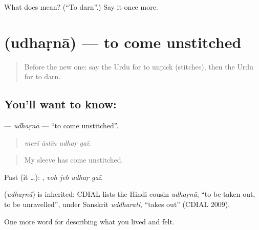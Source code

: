 \begin{tcolorbox}[breakable,colback=teal!4,colframe=teal!35!black,title={Before you move on}]
What does   mean? (\textquotedblleft{}To darn\textquotedblright{}.) Say it once more.
\end{tcolorbox}
\section[\texorpdfstring{\ur{ادھڑنا} (udhaṛnā)}{ادھڑنا (udhaṛnā)}]{ (udhaṛnā) — to come unstitched}

\label{lesson:UR-C500-udharna}



\begin{quote}
Before the new one: say the Urdu for to unpick (stitches), then the Urdu for to darn.
\end{quote}

\subsection*{You'll want to know: }
\textbf{} — \emph{udhaṛnā} — \textquotedblleft{}to come unstitched\textquotedblright{}.

\begin{quote}
   
\end{quote}

\begin{quote}
\emph{merī āstīn udhaṛ gaī.}
\end{quote}

\begin{quote}
My sleeve has come unstitched.
\end{quote}

Past (it …):    , \emph{voh jeb udhaṛ gaī}.

\begin{cousinweb}
\textbf{} (\emph{udhaṛnā}) is inherited: CDIAL lists the Hindi cousin \emph{udhaṛnā}, \textquotedblleft{}to be taken out, to be unravelled\textquotedblright{}, under Sanskrit \emph{uddharati}, \textquotedblleft{}takes out\textquotedblright{} (CDIAL 2009).
\end{cousinweb}

\begin{grammarlens}[title={What you've built}]
One more word for describing what you lived and felt.
\end{grammarlens}

